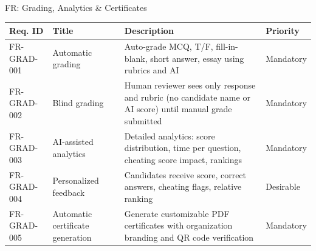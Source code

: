 \begin{frame}{FR: Grading, Analytics \& Certificates}
    \begin{table}[]
        \centering
        \tiny
        \begin{tabular}{|l|p{3.5cm}|p{5cm}|l|}
            \hline
            \textbf{Req. ID} & \textbf{Title} & \textbf{Description} & \textbf{Priority} \\
            \hline
            FR-GRAD-001 & Automatic grading & Auto-grade MCQ, T/F, fill-in-blank, short answer, essay using rubrics and AI & Mandatory \\
            \hline
            FR-GRAD-002 & Blind grading & Human reviewer sees only response and rubric (no candidate name or AI score) until manual grade submitted & Mandatory \\
            \hline
            FR-GRAD-003 & AI-assisted analytics & Detailed analytics: score distribution, time per question, cheating score impact, rankings & Mandatory \\
            \hline
            FR-GRAD-004 & Personalized feedback & Candidates receive score, correct answers, cheating flags, relative ranking & Desirable \\
            \hline
            FR-GRAD-005 & Automatic certificate generation & Generate customizable PDF certificates with organization branding and QR code verification & Mandatory \\
            \hline
        \end{tabular}
    \end{table}
\end{frame}

